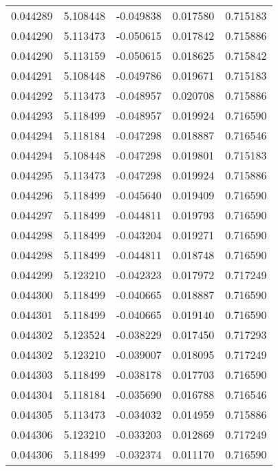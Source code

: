 \begin{tabular}{lrrrr}
0.044289    &  5.108448 & -0.049838 &  0.017580 &             0.715183 \\
0.044290    &  5.113473 & -0.050615 &  0.017842 &             0.715886 \\
0.044290    &  5.113159 & -0.050615 &  0.018625 &             0.715842 \\
0.044291    &  5.108448 & -0.049786 &  0.019671 &             0.715183 \\
0.044292    &  5.113473 & -0.048957 &  0.020708 &             0.715886 \\
0.044293    &  5.118499 & -0.048957 &  0.019924 &             0.716590 \\
0.044294    &  5.118184 & -0.047298 &  0.018887 &             0.716546 \\
0.044294    &  5.108448 & -0.047298 &  0.019801 &             0.715183 \\
0.044295    &  5.113473 & -0.047298 &  0.019924 &             0.715886 \\
0.044296    &  5.118499 & -0.045640 &  0.019409 &             0.716590 \\
0.044297    &  5.118499 & -0.044811 &  0.019793 &             0.716590 \\
0.044298    &  5.118499 & -0.043204 &  0.019271 &             0.716590 \\
0.044298    &  5.118499 & -0.044811 &  0.018748 &             0.716590 \\
0.044299    &  5.123210 & -0.042323 &  0.017972 &             0.717249 \\
0.044300    &  5.118499 & -0.040665 &  0.018887 &             0.716590 \\
0.044301    &  5.118499 & -0.040665 &  0.019140 &             0.716590 \\
0.044302    &  5.123524 & -0.038229 &  0.017450 &             0.717293 \\
0.044302    &  5.123210 & -0.039007 &  0.018095 &             0.717249 \\
0.044303    &  5.118499 & -0.038178 &  0.017703 &             0.716590 \\
0.044304    &  5.118184 & -0.035690 &  0.016788 &             0.716546 \\
0.044305    &  5.113473 & -0.034032 &  0.014959 &             0.715886 \\
0.044306    &  5.123210 & -0.033203 &  0.012869 &             0.717249 \\
0.044306    &  5.118499 & -0.032374 &  0.011170 &             0.716590 \\

\end{tabular}
